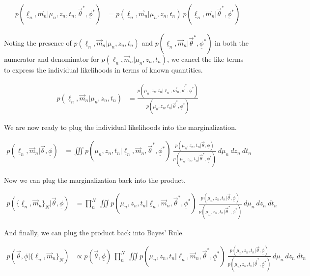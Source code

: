 \documentclass[12pt, onecolumn]{emulateapj}
\newcommand{\textul}{\underline}
\begin{document}
\begin{align}
p(\textul{\ell}_{n}, \vec{m}_{n} | \mu_{n}, z_{n}, t_{n}, \vec{\theta}^{*}, \textul{\phi}^{*}) &= p(\textul{\ell}_{n}, \vec{m}_{n} | \mu_{n}, z_{n}, t_{n})\ p(\textul{\ell}_{n}, \vec{m}_{n} | \vec{\theta}^{*}, \textul{\phi}^{*})
\end{align}

Noting the presence of $p(\textul{\ell}_{n}, \vec{m}_{n} | \mu_{n}, z_{n}, t_{n})$ and $p(\textul{\ell}_{n}, \vec{m}_{n} | \vec{\theta}^{*}, \textul{\phi}^{*})$ in both the numerator and denominator for $p(\textul{\ell}_{n}, \vec{m}_{n} | \mu_{n}, z_{n}, t_{n})$, we cancel the like terms to express the individual likelihoods in terms of known quantities.

\begin{align}
p(\textul{\ell}_{n}, \vec{m}_{n} | \mu_{n}, z_{n}, t_{n}) &= \frac{p(\mu_{n}, z_{n}, t_{n} | \textul{\ell}_{n}, \vec{m}_{n}, \vec{\theta}^{*}, \textul{\phi}^{*})}{p(\mu_{n}, z_{n}, t_{n} | \vec{\theta}^{*}, \textul{\phi}^{*})}
\end{align}

We are now ready to plug the individual likelihoods into the marginalization.

\begin{align}
p(\textul{\ell}_{n}, \vec{m}_{n} | \vec{\theta}, \textul{\phi}) &= \iiint p(\mu_{n}, z_{n}, t_{n} | \textul{\ell}_{n}, \vec{m}_{n}, \vec{\theta}^{*}, \textul{\phi}^{*})\ \frac{p(\mu_{n}, z_{n}, t_{n} | \vec{\theta}, \textul{\phi})}{p(\mu_{n}, z_{n}, t_{n} | \vec{\theta}^{*}, \textul{\phi}^{*})}\ d\mu_{n}\ dz_{n}\ dt_{n}
\end{align}

Now we can plug the marginalization back into the product.

\begin{align}
p(\{\textul{\ell}_{n}, \vec{m}_{n}\}_{N} | \vec{\theta}, \textul{\phi}) &= \prod_{n}^{N}\ \iiint p(\mu_{n}, z_{n}, t_{n} | \textul{\ell}_{n}, \vec{m}_{n}, \vec{\theta}^{*}, \textul{\phi}^{*})\ \frac{p(\mu_{n}, z_{n}, t_{n} | \vec{\theta}, \textul{\phi})}{p(\mu_{n}, z_{n}, t_{n} | \vec{\theta}^{*}, \textul{\phi}^{*})}\ d\mu_{n}\ dz_{n}\ dt_{n}
\end{align}

And finally, we can plug the product back into Bayes' Rule.

\begin{align}
p(\vec{\theta}, \textul{\phi} | \{\textul{\ell}_{n}, \vec{m}_{n}\}_{N}) &\propto p(\vec{\theta}, \textul{\phi})\ \prod_{n}^{N}\ \iiint p(\mu_{n}, z_{n}, t_{n} | \textul{\ell}_{n}, \vec{m}_{n}, \vec{\theta}^{*}, \textul{\phi}^{*})\ \frac{p(\mu_{n}, z_{n}, t_{n} | \vec{\theta}, \textul{\phi})}{p(\mu_{n}, z_{n}, t_{n} | \vec{\theta}^{*}, \textul{\phi}^{*})}\ d\mu_{n}\ dz_{n}\ dt_{n}
\end{align}
\end{document}
